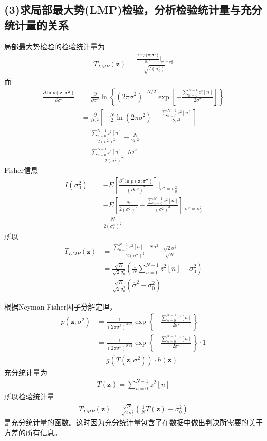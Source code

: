 \documentclass[fontset=windows]{article}
\numberwithin{figure}{section}
\begin{document}
\subsection*{(3)求局部最大势(LMP)检验，分析检验统计量与充分统计量的关系}
局部最大势检验的检验统计量为
\begin{align*}
    T_{LMP}(\mathbf{z})=\frac{\frac{\partial \ln p(\mathbf{z;\sigma^2})}{\partial \sigma^2}|_{\sigma^2=\sigma^2_0}}{\sqrt{I(\sigma^2_0)}}
\end{align*}
而
\begin{align*}
    \frac{\partial \ln p(\mathbf{z;\sigma^2})}{\partial \sigma^2}
     & =\frac{\partial }{\partial \sigma^2}\ln \left\{(2\pi \sigma^2)^{-N/2}\exp\left[ -\frac{\sum_{n=0}^{N-1}z^2[n]}{2\sigma^2}\right]\right\} \\
     & =\frac{\partial }{\partial \sigma^2}\left[-\frac{N}{2} \ln(2\pi \sigma^2)-\frac{\sum_{n=0}^{N-1}z^2[n]}{2\sigma^2}\right]                \\
     & =\frac{\sum_{n=0}^{N-1}z^2[n]}{2(\sigma^2)^2}-\frac{N}{2 \sigma^2}                                                                       \\
     & =\frac{\sum_{n=0}^{N-1}z^2[n]-N\sigma^2 }{2 (\sigma^2)^2}
\end{align*}
Fisher信息
\begin{align*}
    I(\sigma_0^2)
     & =-E\left[ \frac{\partial^2 \ln p(\mathbf{z;\sigma^2})}{(\partial \sigma^2)^2}\right]|_{\sigma^2=\sigma^2_0}  \\
     & =-E\left[ \frac{N}{2 (\sigma^2)^2}-\frac{\sum_{n=0}^{N-1}z^2[n]}{(\sigma^2)^3}\right]|_{\sigma^2=\sigma^2_0} \\
     & =\frac{N}{2 (\sigma^2_0)^2}
\end{align*}
所以
\begin{align*}
    T_{LMP}(\mathbf{z})
     & =\frac{\sum_{n=0}^{N-1}z^2[n]-N\sigma^2 }{2 (\sigma^2)^2}\cdot\frac{\sqrt{2}\sigma_0^2}{\sqrt{N}} \\
     & =\frac{\sqrt{N}}{\sqrt{2}\sigma^2_0}(\frac{1}{N}\sum_{n=0}^{N-1}z^2[n]-\sigma^2_0)                \\
     & =\frac{\sqrt{N}}{\sqrt{2}\sigma^2_0}(\hat{\sigma}^2-\sigma^2_0)
\end{align*}

根据Neyman-Fisher因子分解定理，
\begin{align*}
    p(\mathbf{z};\sigma^2)
     & =\frac{1}{(2\pi \sigma^2)^{N/2}}\exp\left\{ -\frac{\sum_{n=0}^{N-1}z^2[n]}{2\sigma^2}\right\}        \\
     & =\frac{1}{(2\pi \sigma^2)^{N/2}}\exp\left\{ -\frac{\sum_{n=0}^{N-1}z^2[n]}{2\sigma^2}\right\}\cdot 1 \\
     & =g(T(\mathbf{z},\sigma^2))\cdot h(\mathbf{z})
\end{align*}
充分统计量为
\begin{align*}
    T(\mathbf{z})=\sum_{n=0}^{N-1}z^2[n]
\end{align*}
所以检验统计量
\begin{align*}
    T_{LMP}(\mathbf{z})=\frac{\sqrt{N}}{\sqrt{2}\sigma^2_0}(\frac{1}{N}T(\mathbf{z})-\sigma^2_0)
\end{align*}
是充分统计量的函数。这时因为充分统计量包含了在数据中做出判决所需要的关于方差的所有信息。
\end{document}
